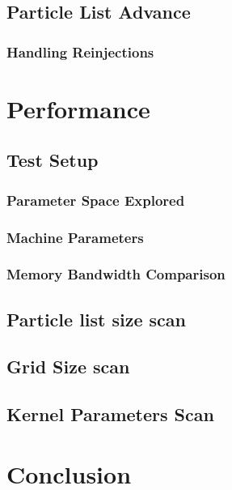 \documentclass[12pt]{article} %
\begin{document}
	\subsection{Particle List Advance}

		\subsubsection{Handling Reinjections}

\section{Performance} 

	\subsection{Test Setup}
		\subsubsection{Parameter Space Explored}
		\subsubsection{Machine Parameters}
		\subsubsection{Memory Bandwidth Comparison}
	
	\subsection{Particle list size scan}
	
	\subsection{Grid Size scan}

	\subsection{Kernel Parameters Scan}

\section{Conclusion} 
\end{document}
